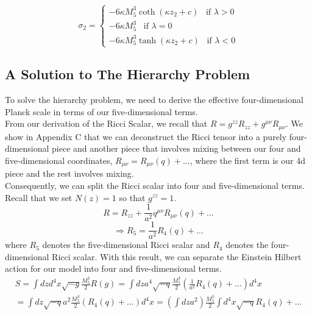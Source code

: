 \documentclass[11pt]{report}
\numberwithin{equation}{chapter}
\begin{document}
\begin{equation}
    \sigma_2=
    \begin{cases}
         -6\kappa M^3_5\coth{\left(\kappa z_2 + c\right)}\hspace{10pt}\text{if } \lambda > 0\\[10pt]
        -6\kappa M^3_5\hspace{10pt}\text{if } \lambda = 0\\[10pt]
        -6\kappa M^3_5\tanh{\left(\kappa z_2 +c\right)}\hspace{10pt}\text{if } \lambda < 0
    \end{cases}
\end{equation}
\subsection{A Solution to The Hierarchy Problem}
To solve the hierarchy problem, we need to derive the effective four-dimensional Planck scale in terms of our five-dimensional terms.
\\
From our derivation of the Ricci Scalar, we recall that $R = g^{zz}R_{zz} + g^{\mu\nu}R_{\mu\nu}$. We show in Appendix C that we can deconstruct the Ricci tensor into a purely four-dimensional piece and another piece that involves mixing between our four and five-dimensional coordinates, $R_{\mu\nu} = R_{\mu\nu}(q) + ...$, where the first term is our 4d piece and the rest involves mixing.\\
Consequently, we can split the Ricci scalar into four and five-dimensional terms. Recall that we set $N(z) = 1$ so that $g^{zz} = 1$.
\begin{equation}
    R = R_{zz} + \frac{1}{a^2}q^{\mu\nu}R_{\mu\nu}(q) +...
\end{equation}
\begin{equation}
    \Rightarrow R_{5}= \frac{1}{a^2}R_{4}(q) + ...
\end{equation}
where $R_5$ denotes the five-dimensional Ricci scalar and $R_4$ denotes the four-dimensional Ricci scalar.
With this result, we can separate the Einstein Hilbert action for our model into four and five-dimensional terms.
\begin{equation}
    \begin{aligned}
    S = \int dzd^4x\sqrt{-g}\frac{M^3_5}{2}R(g) = \int dza^4\sqrt{-q}\frac{M^3_5}{2}(\frac{1}{a^2}R_4(q) + ...)d^4x \\ = \int dz\sqrt{-q}a^2\frac{M^3_5}{2}(R_4(q) + ...)d^4x = (\int dza^2)\frac{M^3_5}{2}\int d^4x\sqrt{-q}R_4(q) + ...
    \end{aligned}
\end{equation}
\end{document}
